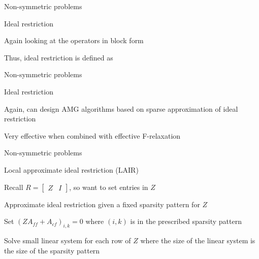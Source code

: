 \documentclass[18pt,xcolor=table]{beamer}
\begin{document}
\begin{frame}{Non-symmetric problems}
\begin{block}{Ideal restriction}
\bit
\item Again looking at the operators in block form
\item Thus, ideal restriction is defined as
\eit
\end{block}
\end{frame}

\begin{frame}{Non-symmetric problems}
\begin{block}{Ideal restriction}
\bit
\item Again, can design AMG algorithms based on sparse approximation of ideal restriction
\item Very effective when combined with effective F-relaxation
\eit
\end{block}
\end{frame}

\begin{frame}{Non-symmetric problems}
\begin{block}{Local approximate ideal restriction (LAIR)}
\bit
\item Recall $R = \begin{bmatrix}Z & I \end{bmatrix}$, so want to set entries in $Z$
\item Approximate ideal restriction given a fixed sparsity pattern for $Z$
\item Set $(ZA_{ff} + A_{cf})_{i,k} = 0$ where $(i,k)$ is in the prescribed sparsity pattern
\item Solve small linear system for each row of $Z$ where the size of the linear system is the size of the sparsity pattern
\eit
\end{block}
\end{frame}
\end{document}
